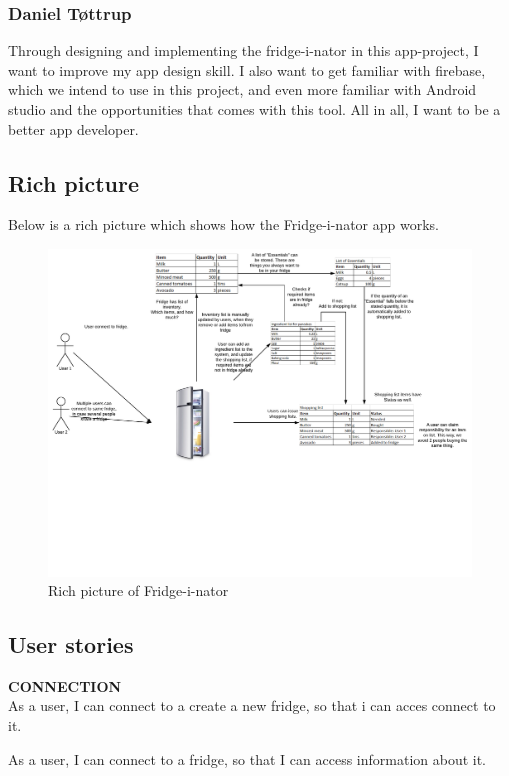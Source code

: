 \subsubsection{Daniel Tøttrup}
Through designing and implementing the fridge-i-nator in this app-project, I want to improve my app design skill. I also want to get familiar
with firebase, which we intend to use in this project, and even more familiar with
Android studio and the opportunities that comes with this tool. All in all, I want to be a better app developer.

\subsection{Rich picture}
Below is a rich picture which shows how the Fridge-i-nator app works.

\begin{figure}[H]
	\centering
	\includegraphics[width=180mm]{Img/Fridge_rich_picture.pdf}
	\caption{Rich picture of Fridge-i-nator}
	\label{fig:RichPic}
\end{figure}

\subsection{User stories}

\textbf{CONNECTION}\\
As a user, I can connect to a create a new fridge, so that i can acces connect to it.

As a user, I can connect to a fridge, so that I can access information about it.

